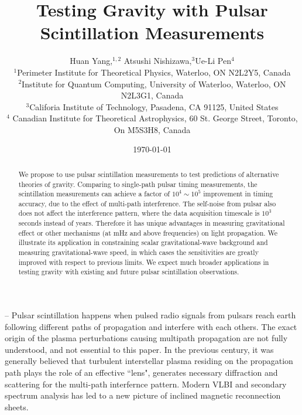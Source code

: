 \documentclass[prl,aps,floatfix,superscriptaddress,twocolumn]{revtex4}
\begin{document}
  



\title{ Testing Gravity with Pulsar Scintillation Measurements} 



\author{Huan Yang,$^{1,2}$ Atsushi Nishizawa,$^{3} $Ue-Li Pen$^{4}$\\
%
$^{1}$Perimeter Institute for Theoretical Physics, Waterloo, ON N2L2Y5, Canada\\
$^{2}$Institute for Quantum Computing, University of Waterloo, Waterloo,
ON N2L3G1, Canada\\
$^{3}$Califoria Institute of Technology, Pasadena, CA 91125, United States \\
$^{4}$ Canadian Institute for Theoretical Astrophysics, 60 St. George Street,
Toronto, On M5S3H8, Canada
}


\date{\today}





\begin{abstract}
We propose to use pulsar scintillation measurements to test predictions of alternative theories of gravity. Comparing to single-path pulsar timing measurements, the scintillation measurements can achieve a factor of $10^4 \sim 10^5 $ improvement in timing accuracy, due to the effect of multi-path interference. The self-noise from pulsar also does not affect the interference pattern, where the data acquisition timescale is $10^3$ seconds instead of years. Therefore it has unique advantages in measuring gravitational effect or other mechanisms (at mHz and above frequencies) on light propagation. We illustrate its application in constraining scalar gravitational-wave background and measuring gravitational-wave speed, in which cases the sensitivities are greatly improved with respect to previous limits. We expect much broader applications in testing gravity with existing and future pulsar scintillation observations. 
\end{abstract}

\maketitle 

 -- Pulsar scintillation happens when
pulsed radio signals from pulsars reach earth following different
paths of propagation and interfere with each others.  The exact origin
of the plasma perturbations causing multipath propagation are not
fully understood, and not essential to this paper.  In the previous
century, it was generally believed that turbulent interstellar plasma
residing on the propagation path plays the role of an effective
``lens", generates necessary diffraction and scattering for the
multi-path interfernce pattern.  Modern VLBI and secondary spectrum
analysis has led to a new picture of inclined magnetic reconnection
sheets\cite{2014MNRAS.442.3338P}.
\end{document}
